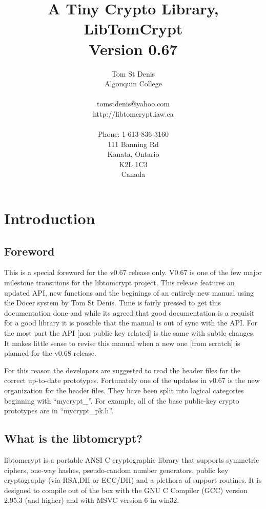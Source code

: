 \documentclass{book}
\begin{document}
\title{A Tiny Crypto Library, \\ LibTomCrypt \\ Version 0.67}
\author{Tom St Denis \\
Algonquin College \\
\\
tomstdenis@yahoo.com \\
http://libtomcrypt.iaw.ca \\ \\
Phone: 1-613-836-3160\\
111 Banning Rd \\
Kanata, Ontario \\
K2L 1C3 \\
Canada 
}
\maketitle
\newpage
\tableofcontents
\chapter{Introduction}
\section*{Foreword}
This is a special foreword for the v0.67 release only.  V0.67 is one of the few major milestone transitions for the 
libtomcrypt project.  This release features an updated API, new functions and the beginings of an entirely new manual
using the Docer system by Tom St Denis.  Time is fairly pressed to get this documentation done and while its agreed that
good documentation is a requisit for a good library it is possible that the manual is out of sync with the API.  For the most
part the API [non public key related] is the same with subtle changes.  It makes little sense to revise this manual when
a new one [from scratch] is planned for the v0.68 release.

For this reason the developers are suggested to read the header files for the correct up-to-date prototypes.  Fortunately
one of the updates in v0.67 is the new organization for the header files.  They have been split into logical categories 
beginning with ``mycrypt\_''.  For example, all of the base public-key crypto prototypes are in ``mycrypt\_pk.h''.
\newpage

\section{What is the libtomcrypt?}
libtomcrypt is a portable ANSI C cryptographic library that supports
symmetric ciphers, one-way hashes, pseudo-random number generators, public key cryptography (via RSA,DH or ECC/DH) and 
a plethora of support routines.  It is designed to compile out of the box with the GNU C Compiler (GCC) version 
2.95.3 (and higher) and with MSVC version 6 in win32.
\end{document}
